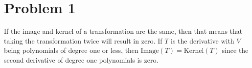 \section*{Problem 1}
If the image and kernel of a transformation are the same, 
then that means that taking the transformation twice will result in zero.
If $T$ is the derivative with $V$ being polynomials of degree one or less,
then $\text{Image}(T) = \text{Kernel}(T)$ 
since the second derivative of degree one polynomials is zero.